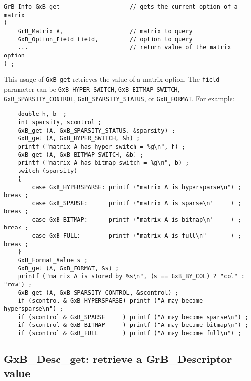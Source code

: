 \documentclass[12pt]{article}
\begin{document}
\begin{mdframed}[userdefinedwidth=6in]
{\footnotesize
\begin{verbatim}
GrB_Info GxB_get                    // gets the current option of a matrix
(
    GrB_Matrix A,                   // matrix to query
    GxB_Option_Field field,         // option to query
    ...                             // return value of the matrix option
) ;
\end{verbatim} } \end{mdframed}

This usage of \verb'GxB_get' retrieves the value of a matrix option.  The
\verb'field' parameter can be
\verb'GxB_HYPER_SWITCH',
\verb'GxB_BITMAP_SWITCH',
\verb'GxB_SPARSITY_CONTROL',
\verb'GxB_SPARSITY_STATUS',
or
\verb'GxB_FORMAT'.
For example:

\vspace{-0.1in}
{\footnotesize
\begin{verbatim}
    double h, b  ;
    int sparsity, scontrol ;
    GxB_get (A, GxB_SPARSITY_STATUS, &sparsity) ;
    GxB_get (A, GxB_HYPER_SWITCH, &h) ;
    printf ("matrix A has hyper_switch = %g\n", h) ;
    GxB_get (A, GxB_BITMAP_SWITCH, &b) ;
    printf ("matrix A has bitmap_switch = %g\n", b) ;
    switch (sparsity)
    {
        case GxB_HYPERSPARSE: printf ("matrix A is hypersparse\n") ; break ;
        case GxB_SPARSE:      printf ("matrix A is sparse\n"     ) ; break ;
        case GxB_BITMAP:      printf ("matrix A is bitmap\n"     ) ; break ;
        case GxB_FULL:        printf ("matrix A is full\n"       ) ; break ;
    }
    GxB_Format_Value s ;
    GxB_get (A, GxB_FORMAT, &s) ;
    printf ("matrix A is stored by %s\n", (s == GxB_BY_COL) ? "col" : "row") ;
    GxB_get (A, GxB_SPARSITY_CONTROL, &scontrol) ;
    if (scontrol & GxB_HYPERSPARSE) printf ("A may become hypersparse\n") ;
    if (scontrol & GxB_SPARSE     ) printf ("A may become sparse\n") ;
    if (scontrol & GxB_BITMAP     ) printf ("A may become bitmap\n") ;
    if (scontrol & GxB_FULL       ) printf ("A may become full\n") ; \end{verbatim} }

\newpage
\subsection{{\sf GxB\_Desc\_get:} retrieve a {\sf GrB\_Descriptor} value}
\end{document}
